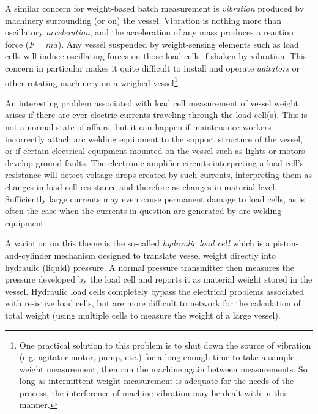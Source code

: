 A similar concern for weight-based batch measurement is \textit{vibration} produced by machinery surrounding (or on) the vessel.  Vibration is nothing more than oscillatory \textit{acceleration}, and the acceleration of any mass produces a reaction force ($F = ma$).  Any vessel suspended by weight-sensing elements such as load cells will induce oscillating forces on those load cells if shaken by vibration.  This concern in particular makes it quite difficult to install and operate \textit{agitators} or other rotating machinery on a weighed vessel\footnote{One practical solution to this problem is to shut down the source of vibration (e.g. agitator motor, pump, etc.) for a long enough time to take a sample weight measurement, then run the machine again between measurements.  So long as intermittent weight measurement is adequate for the needs of the process, the interference of machine vibration may be dealt with in this manner.}.

\vskip 10pt

An interesting problem associated with load cell measurement of vessel weight arises if there are ever electric currents traveling through the load cell(s).  This is not a normal state of affairs, but it can happen if maintenance workers incorrectly attach arc welding equipment to the support structure of the vessel, or if certain electrical equipment mounted on the vessel such as lights or motors develop ground faults.  The electronic amplifier circuits interpreting a load cell's resistance will detect voltage drops created by such currents, interpreting them as changes in load cell resistance and therefore as changes in material level.  Sufficiently large currents may even cause permanent damage to load cells, as is often the case when the currents in question are generated by arc welding equipment.

\vskip 10pt

A variation on this theme is the so-called \textit{hydraulic load cell} which is a piston-and-cylinder mechanism designed to translate vessel weight directly into hydraulic (liquid) pressure.  A normal pressure transmitter then measures the pressure developed by the load cell and reports it as material weight stored in the vessel.  Hydraulic load cells completely bypass the electrical problems associated with resistive load cells, but are more difficult to network for the calculation of total weight (using multiple cells to measure the weight of a large vessel).   







